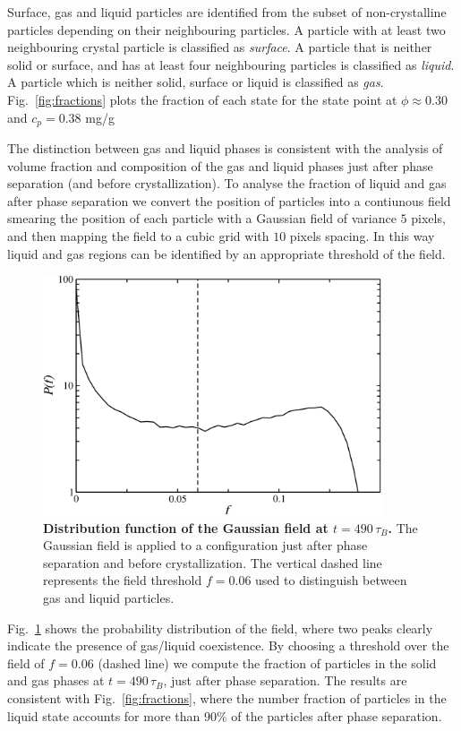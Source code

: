 Surface, gas and liquid particles are identified from the subset of non-crystalline particles depending
on their neighbouring particles. A particle with at least two neighbouring crystal particle is classified as
\emph{surface}. A particle that is neither solid or surface, and has at least four neighbouring particles
is classified as \emph{liquid}. A particle which is neither solid, surface or liquid is classified as \emph{gas}.
Fig.~\ref{fig:fractions} plots the fraction of each state for the state point at $\phi\approx 0.30$ and $c_p=0.38$ mg/g

The distinction between gas and liquid phases is consistent with the analysis of volume fraction and composition
of the gas and liquid phases just after phase separation (and before crystallization). To analyse the fraction
of liquid and gas after phase separation we convert the position of particles into a contiunous field smearing
the position of each particle with a Gaussian field of variance $5$ pixels, and then mapping the field
to a cubic grid with $10$ pixels spacing. In this way liquid and gas regions can be identified by
an appropriate threshold of the field.

\begin{figure}[!t]
 \centering
 \includegraphics[width=10cm]{./field.pdf}
 \caption{{\bf Distribution function of the Gaussian field at $t=490\,\tau_B$.} The Gaussian field is applied to
 a configuration just after phase separation and before crystallization. The vertical dashed line represents the
 field threshold $f=0.06$ used to distinguish between gas and liquid particles.}
 \label{fig:field}
\end{figure}

Fig.~\ref{fig:field} shows the probability distribution of the field, where two peaks clearly indicate the presence
of gas/liquid coexistence. By choosing a threshold over the field of $f=0.06$ (dashed line) we compute the fraction
of particles in the solid and gas phases at $t=490\,\tau_B$, just after phase separation. The results are consistent
with Fig.~\ref{fig:fractions}, where the number fraction of particles in the liquid state accounts for more than
$90\%$ of the particles after phase separation.

